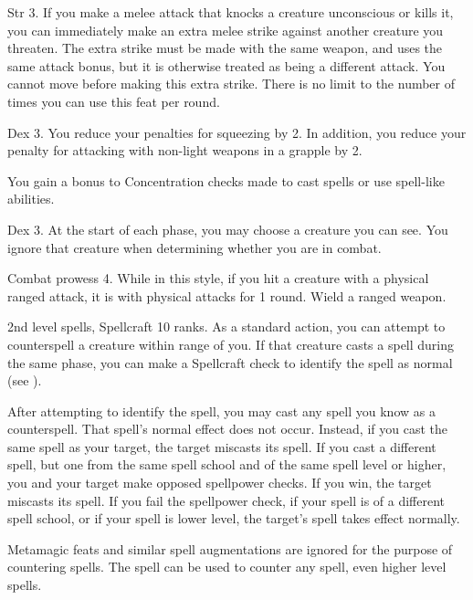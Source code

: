 \featpre Str 3.
\featben If you make a melee attack that knocks a creature unconscious or kills it, you can immediately make an extra melee strike against another creature you threaten.
The extra strike must be made with the same weapon, and uses the same attack bonus, but it is otherwise treated as being a different attack.
You cannot move before making this extra strike.
There is no limit to the number of times you can use this feat per round.

\featpre Dex 3.
\featben You reduce your penalties for squeezing by 2. In addition, you reduce your penalty for attacking with non-light weapons in a grapple by 2.

\featben You gain a  bonus to Concentration checks made to cast spells or use spell-like abilities.

\featpre Dex 3.
\featben At the start of each phase, you may choose a creature you can see.
You ignore that creature when determining whether you are \engaged in combat.

\featpres Combat prowess 4.
\featben While in this style, if you hit a creature with a physical ranged attack, it is \impaired with physical attacks for 1 round.
\stylereq Wield a ranged weapon.

\featpres 2nd level spells, Spellcraft 10 ranks.
\featben As a standard action, you can attempt to counterspell a creature within \rngmed range of you.
If that creature casts a spell during the same phase, you can make a Spellcraft check to identify the spell as normal (see ).

After attempting to identify the spell, you may cast any spell you know as a counterspell.
That spell's normal effect does not occur.
Instead, if you cast the same spell as your target, the target miscasts its spell.
If you cast a different spell, but one from the same spell school and of the same spell level or higher, you and your target make opposed spellpower checks.
If you win, the target miscasts its spell.
If you fail the spellpower check, if your spell is of a different spell school, or if your spell is lower level, the target's spell takes effect normally.

Metamagic feats and similar spell augmentations are ignored for the purpose of countering spells.
The 
spell can be used to counter any spell, even higher level spells.

